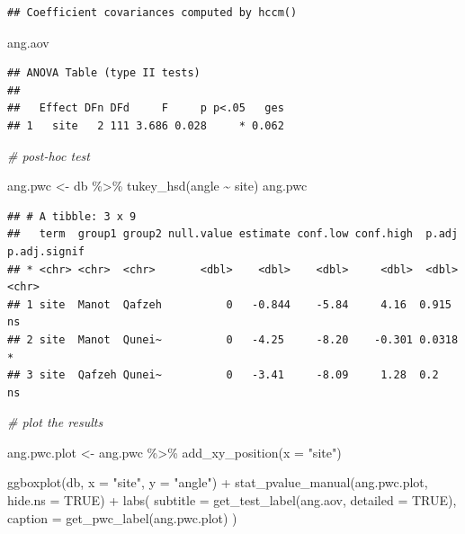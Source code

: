 \documentclass[
]{article}
\newenvironment{Shaded}{\begin{snugshade}}{\end{snugshade}}
\newcommand{\AttributeTok}[1]{\textcolor[rgb]{0.77,0.63,0.00}{#1}}
\newcommand{\CommentTok}[1]{\textcolor[rgb]{0.56,0.35,0.01}{\textit{#1}}}
\newcommand{\ConstantTok}[1]{\textcolor[rgb]{0.00,0.00,0.00}{#1}}
\newcommand{\FunctionTok}[1]{\textcolor[rgb]{0.00,0.00,0.00}{#1}}
\newcommand{\NormalTok}[1]{#1}
\newcommand{\OtherTok}[1]{\textcolor[rgb]{0.56,0.35,0.01}{#1}}
\newcommand{\SpecialCharTok}[1]{\textcolor[rgb]{0.00,0.00,0.00}{#1}}
\newcommand{\StringTok}[1]{\textcolor[rgb]{0.31,0.60,0.02}{#1}}
\begin{document}
\begin{verbatim}
## Coefficient covariances computed by hccm()
\end{verbatim}

\begin{Shaded}
\begin{Highlighting}[]
\NormalTok{ang.aov}
\end{Highlighting}
\end{Shaded}

\begin{verbatim}
## ANOVA Table (type II tests)
## 
##   Effect DFn DFd     F     p p<.05   ges
## 1   site   2 111 3.686 0.028     * 0.062
\end{verbatim}

\begin{Shaded}
\begin{Highlighting}[]
\CommentTok{\# post{-}hoc test}

\NormalTok{ang.pwc }\OtherTok{\textless{}{-}}\NormalTok{ db }\SpecialCharTok{\%\textgreater{}\%} \FunctionTok{tukey\_hsd}\NormalTok{(angle }\SpecialCharTok{\textasciitilde{}}\NormalTok{ site)}
\NormalTok{ang.pwc}
\end{Highlighting}
\end{Shaded}

\begin{verbatim}
## # A tibble: 3 x 9
##   term  group1 group2 null.value estimate conf.low conf.high  p.adj p.adj.signif
## * <chr> <chr>  <chr>       <dbl>    <dbl>    <dbl>     <dbl>  <dbl> <chr>       
## 1 site  Manot  Qafzeh          0   -0.844    -5.84     4.16  0.915  ns          
## 2 site  Manot  Qunei~          0   -4.25     -8.20    -0.301 0.0318 *           
## 3 site  Qafzeh Qunei~          0   -3.41     -8.09     1.28  0.2    ns
\end{verbatim}

\begin{Shaded}
\begin{Highlighting}[]
\CommentTok{\# plot the results}

\NormalTok{ang.pwc.plot }\OtherTok{\textless{}{-}}\NormalTok{ ang.pwc }\SpecialCharTok{\%\textgreater{}\%} \FunctionTok{add\_xy\_position}\NormalTok{(}\AttributeTok{x =} \StringTok{"site"}\NormalTok{)}


\FunctionTok{ggboxplot}\NormalTok{(db, }\AttributeTok{x =} \StringTok{"site"}\NormalTok{, }\AttributeTok{y =} \StringTok{"angle"}\NormalTok{) }\SpecialCharTok{+}
  \FunctionTok{stat\_pvalue\_manual}\NormalTok{(ang.pwc.plot, }\AttributeTok{hide.ns =} \ConstantTok{TRUE}\NormalTok{) }\SpecialCharTok{+}
  \FunctionTok{labs}\NormalTok{(}
    \AttributeTok{subtitle =} \FunctionTok{get\_test\_label}\NormalTok{(ang.aov, }\AttributeTok{detailed =} \ConstantTok{TRUE}\NormalTok{),}
    \AttributeTok{caption =} \FunctionTok{get\_pwc\_label}\NormalTok{(ang.pwc.plot)}
\NormalTok{    )}
\end{Highlighting}
\end{Shaded}
\end{document}
